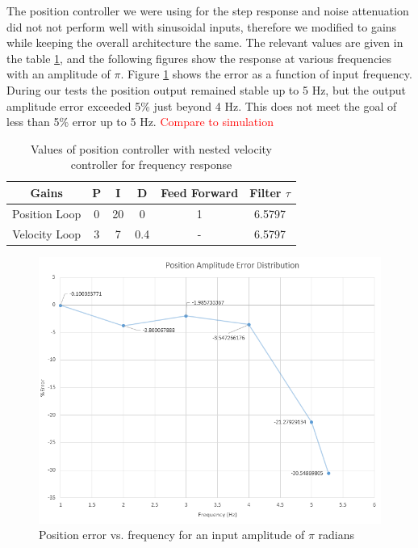 \documentclass{article}
\newcommand{\xxx}[1]{\textcolor{red}{#1}}
\theoremstyle{plain}
\theoremstyle{definition}
\theoremstyle{remark}
\begin{document}
The position controller we were using for the step response and noise attenuation did not not perform well with sinusoidal inputs, therefore we modified to gains while keeping the overall architecture the same. The relevant values are given in the table \ref{positionFreqGains}, and the following figures show the response at various frequencies with an amplitude of $\pi$. Figure \ref{PosFreqError} shows the error as a function of input frequency. During our tests the position output remained stable up to 5 Hz, but the output amplitude error exceeded 5\% just beyond 4 Hz. This does not meet the goal of less than 5\% error up to 5 Hz.
\xxx{Compare to simulation}

\begin{table}[htb]
\begin{center}
    \begin{tabular}{|c|c|c|c|c|c|}
        \hline
        Gains & P   & I & D   & Feed Forward   & Filter $\tau$   \\ \hline
        Position Loop            & 0 & 20  & 0 & 1 & 6.5797    \\ 
        Velocity Loop       & 3   & 7    & 0.4   & -  & 6.5797  \\ 
       \hline
    \end{tabular}
\end{center}
\caption{Values of position controller with nested velocity controller for frequency response}
\label{positionFreqGains}
\end{table}

\begin{figure}[htb]
\begin{center}
\includegraphics[width = 14cm]{PositionControl_Error.png}
\caption{Position error vs. frequency for an input amplitude of $\pi$ radians}
\label{PosFreqError}
\end{center}
\end{figure}
\end{document}
